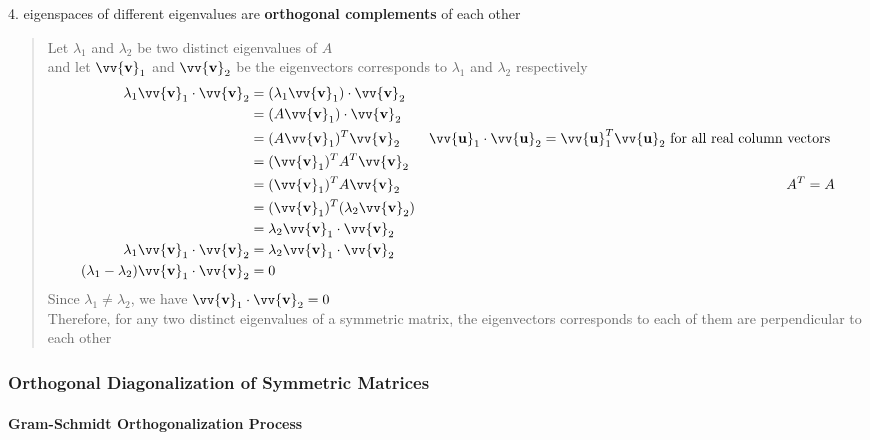 \documentclass[11pt]{article}
\DeclareRobustCommand{\myvec}[1]{\vv{\mathbf{#1}}}
\newcommand{\mymat}[1]{#1}
\newcommand{\dotprod}[2]{#1 \cdot #2}
\begin{document}
    \noindent
    \begin{minipage}{\textwidth}
        4. eigenspaces of different eigenvalues are \textbf{orthogonal complements} of each other
        \begin{quote}
            Let $\lambda_1$ and $\lambda_2$ be two distinct eigenvalues of $\mymat{A}$ \\
            and let $\myvec{v}_1$ and $\myvec{v}_2$ be the eigenvectors corresponds to $\lambda_1$ and $\lambda_2$ respectively
            \begin{align*}
                \lambda_1 \dotprod{\myvec{v}_1}{\myvec{v}_2} &= \dotprod{(\lambda_1 \myvec{v}_1)}{\myvec{v}_2} \\
                &= \dotprod{(\mymat{A} \myvec{v}_1)}{\myvec{v}_2} \\
                &= (\mymat{A} \myvec{v}_1)^T \myvec{v}_2 & \dotprod{\myvec{u}_1}{\myvec{u}_2} = \myvec{u}_1^T \myvec{u}_2 \text{ for all real column vectors } \\
                &= (\myvec{v}_1)^T \mymat{A}^T \myvec{v}_2 \\
                &= (\myvec{v}_1)^T \mymat{A} \myvec{v}_2 & \mymat{A}^T = \mymat{A}\\
                &= (\myvec{v}_1)^T (\lambda_2 \myvec{v}_2) \\
                &= \lambda_2 \dotprod{\myvec{v}_1}{\myvec{v}_2} \\
                \lambda_1 \dotprod{\myvec{v}_1}{\myvec{v}_2} &= \lambda_2 \dotprod{\myvec{v}_1}{\myvec{v}_2} \\
                (\lambda_1 - \lambda_2) \dotprod{\myvec{v}_1}{\myvec{v}_2} &= 0 
            \end{align*}
            Since $\lambda_1 \ne \lambda_2$, we have $\dotprod{\myvec{v}_1}{\myvec{v}_2} = 0$ \\ 
            Therefore, for any two distinct eigenvalues of a symmetric matrix, the eigenvectors corresponds to each of them are perpendicular to each other
        \end{quote}
    \end{minipage}

    \newpage
    \subsubsection{Orthogonal Diagonalization of Symmetric Matrices}
    \paragraph{Gram-Schmidt Orthogonalization Process}~\vspace{1ex}
\end{document}
